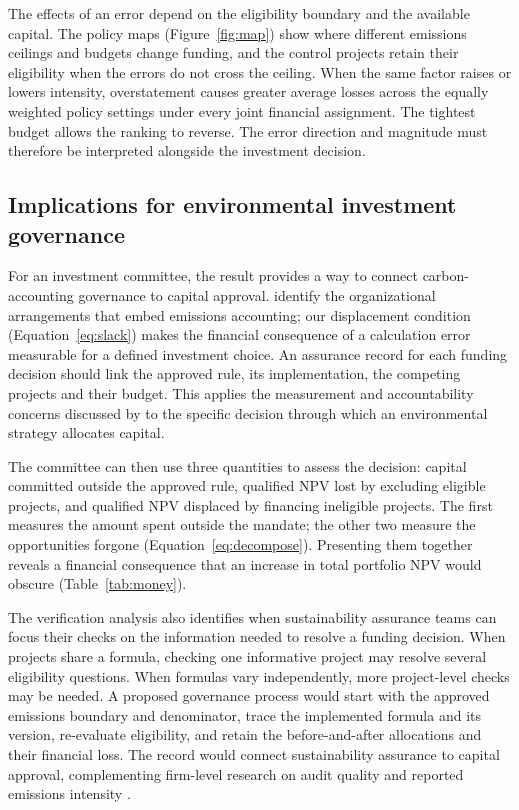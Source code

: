 The effects of an error depend on the eligibility boundary and the available capital. The policy maps (Figure~\ref{fig:map}) show where different emissions ceilings and budgets change funding, and the control projects retain their eligibility when the errors do not cross the ceiling. When the same factor raises or lowers intensity, overstatement causes greater average losses across the equally weighted policy settings under every joint financial assignment. The tightest budget allows the ranking to reverse. The error direction and magnitude must therefore be interpreted alongside the investment decision.

\subsection{Implications for environmental investment governance}
For an investment committee, the result provides a way to connect carbon-accounting governance to capital approval. \citet{ruan2026} identify the organizational arrangements that embed emissions accounting; our displacement condition (Equation~\eqref{eq:slack}) makes the financial consequence of a calculation error measurable for a defined investment choice. An assurance record for each funding decision should link the approved rule, its implementation, the competing projects and their budget. This applies the measurement and accountability concerns discussed by \citet{tian2026} to the specific decision through which an environmental strategy allocates capital.

The committee can then use three quantities to assess the decision: capital committed outside the approved rule, qualified NPV lost by excluding eligible projects, and qualified NPV displaced by financing ineligible projects. The first measures the amount spent outside the mandate; the other two measure the opportunities forgone (Equation~\eqref{eq:decompose}). Presenting them together reveals a financial consequence that an increase in total portfolio NPV would obscure (Table~\ref{tab:money}).

The verification analysis also identifies when sustainability assurance teams can focus their checks on the information needed to resolve a funding decision. When projects share a formula, checking one informative project may resolve several eligibility questions. When formulas vary independently, more project-level checks may be needed. A proposed governance process would start with the approved emissions boundary and denominator, trace the implemented formula and its version, re-evaluate eligibility, and retain the before-and-after allocations and their financial loss. The record would connect sustainability assurance to capital approval, complementing firm-level research on audit quality and reported emissions intensity \citep{ibrahim2026}.

